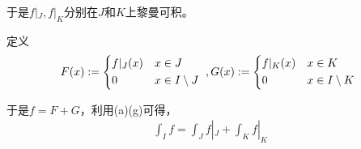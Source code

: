 \documentclass{article}
\begin{document}
\begin{itemize}
        于是$f|_J, f|_K$分别在$J$和$K$上黎曼可积。

        定义
        \begin{equation*}
          F(x) :=
          \begin{cases*}
            f|_J(x) & $x \in J$             \\
            0      & $x \in I \setminus J$
          \end{cases*}
          ,G(x) :=
          \begin{cases*}
            f|_K(x) & $x \in K$             \\
            0       & $x \in I \setminus K$
          \end{cases*}
        \end{equation*}

        于是$f = F + G$，利用(a)(g)可得，
        \begin{align*}
          \int_I f = \int_J f|_J + \int_K f|_K 
        \end{align*}
\end{itemize}
\end{document}

